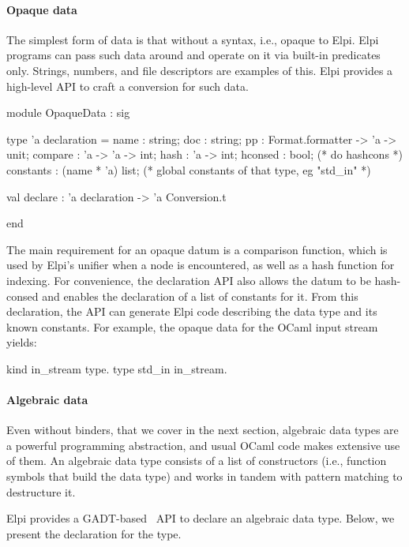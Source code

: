 \documentclass[a4paper, 11pt]{book}
\begin{document}
\paragraph{Opaque data}

The simplest form of data is that without a syntax, i.e., opaque to Elpi. Elpi
programs can pass such data around and operate on it via built-in predicates
only. Strings, numbers, and file descriptors are examples of this. Elpi
provides a high-level API to craft a conversion for such data.

\begin{ocamlcode}
module OpaqueData : sig

  type 'a declaration = {
    name : string;
    doc : string;
    pp : Format.formatter -> 'a -> unit;
    compare : 'a -> 'a -> int;
    hash : 'a -> int;
    hconsed : bool;               (* do hashcons *)
    constants : (name * 'a) list; (* global constants of that type,
                                     eg "std_in" *)
  }

  val declare : 'a declaration -> 'a Conversion.t

end
\end{ocamlcode}

\noindent
The main requirement for an opaque datum is a comparison function, which is
used by Elpi's unifier when a  node is encountered, as well as a
hash function for indexing. For convenience, the declaration API also allows
the datum to be hash-consed and enables the declaration of a list of constants
for it. From this declaration, the API can generate Elpi code describing the
data type and its known constants. For example, the opaque data for the OCaml
input stream yields:

\begin{elpicode}
kind in_stream type.
type std_in in_stream.
\end{elpicode}

\paragraph{Algebraic data}

Even without binders, that we cover in the next section,
algebraic data types are a powerful programming
abstraction, and usual OCaml code makes extensive use of them. An algebraic
data type consists of a list of constructors (i.e., function symbols that build
the data type) and works in tandem with pattern matching to destructure it.

Elpi provides a GADT-based~\cite{SHEARD200849} API to declare an algebraic
data type. Below, we present the declaration for the  type.
\end{document}
